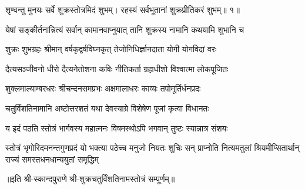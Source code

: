 

\twolineshloka
{शृण्वन्तु मुनयः सर्वे शुक्रस्तोत्रमिदं शुभम्।}
{रहस्यं सर्वभूतानां शुक्रप्रीतिकरं शुभम्॥ १॥}

\twolineshloka
{येषां सङ्कीर्तनान्नित्यं सर्वान् कामानवाप्नुयात्}
{तानि शुक्रस्य नामानि कथयामि शुभानि च}

\twolineshloka
{शुक्रः शुभग्रहः श्रीमान् वर्षकृद्वर्षविघ्नकृत्}
{तेजोनिधिर्ज्ञानदाता योगी योगविदां वरः}

\twolineshloka
{दैत्यसञ्जीवनो धीरो दैत्यनेतोशना कविः}
{नीतिकर्ता ग्रहाधीशो विश्वात्मा लोकपूजितः}

\twolineshloka
{शुक्लमाल्याम्बरधरः श्रीचन्दनसमप्रभः}
{अक्षमालाधरः काव्यः तपोमूर्तिर्धनप्रदः}

\twolineshloka
{चतुर्विंशतिनामानि अष्टोत्तरशतं यथा}
{देवस्याग्रे विशेषेण पूजां कृत्वा विधानतः}

\twolineshloka
{य इदं पठति स्तोत्रं भार्गवस्य महात्मनः}
{विषमस्थोऽपि भगवान् तुष्टः स्यान्नात्र संशयः}

\fourlineindentedshloka
{स्तोत्रं भृगोरिदमनन्तगुणप्रदं यो}
{भक्त्या पठेच्च मनुजो नियतः शुचिः सन्}
{प्राप्नोति नित्यमतुलां श्रियमीप्सितार्थान्}
{राज्यं समस्तधनधान्ययुतां समृद्धिम्}

॥इति श्री-स्कान्दपुराणे श्री-शुक्रचतुर्विंशतिनामस्तोत्रं सम्पूर्णम्॥
